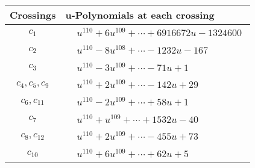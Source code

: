 \documentclass[1p]{elsarticle_modified}
\theoremstyle{definition}
\begin{document}
\begin{tabular}{m{50pt}|m{274pt}}
Crossings & \hspace{64pt}u-Polynomials at each crossing \\
\hline $$\begin{aligned}c_{1}\end{aligned}$$&$\begin{aligned}
&u^{110}+6 u^{109}+\cdots+6916672 u-1324600
\end{aligned}$\\
\hline $$\begin{aligned}c_{2}\end{aligned}$$&$\begin{aligned}
&u^{110}-8 u^{108}+\cdots-1232 u-167
\end{aligned}$\\
\hline $$\begin{aligned}c_{3}\end{aligned}$$&$\begin{aligned}
&u^{110}-3 u^{109}+\cdots-71 u+1
\end{aligned}$\\
\hline $$\begin{aligned}c_{4},c_{5},c_{9}\end{aligned}$$&$\begin{aligned}
&u^{110}+2 u^{109}+\cdots-142 u+29
\end{aligned}$\\
\hline $$\begin{aligned}c_{6},c_{11}\end{aligned}$$&$\begin{aligned}
&u^{110}-2 u^{109}+\cdots+58 u+1
\end{aligned}$\\
\hline $$\begin{aligned}c_{7}\end{aligned}$$&$\begin{aligned}
&u^{110}+u^{109}+\cdots+1532 u-40
\end{aligned}$\\
\hline $$\begin{aligned}c_{8},c_{12}\end{aligned}$$&$\begin{aligned}
&u^{110}+2 u^{109}+\cdots-455 u+73
\end{aligned}$\\
\hline $$\begin{aligned}c_{10}\end{aligned}$$&$\begin{aligned}
&u^{110}+6 u^{109}+\cdots+62 u+5
\end{aligned}$\\
\hline
\end{tabular}\\~\\
\end{document}
